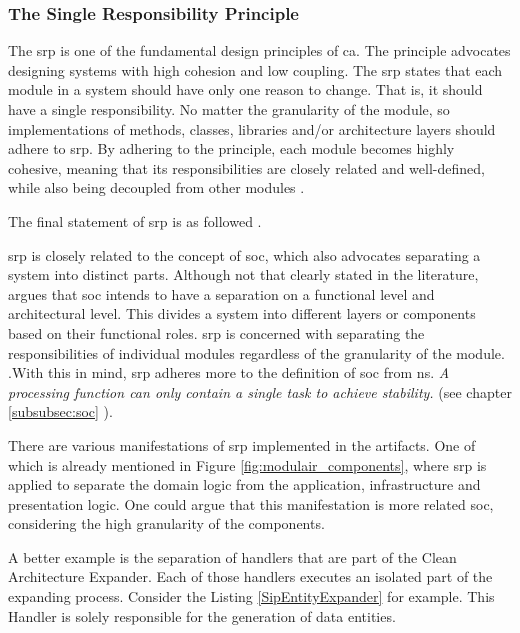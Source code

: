 \subsubsection*{The Single Responsibility Principle} \label{subsubsec:srp}

The \gls{srp} is one of the fundamental design principles of \gls{ca}. The principle
advocates designing systems with high cohesion and low coupling. The \gls{srp} states that
each module in a system should have only one reason to change. That is, it should have a
single responsibility. No matter the granularity of the module, so implementations of
methods, classes, libraries and/or architecture layers should adhere to \gls{srp}. By
adhering to the principle, each module becomes highly cohesive, meaning that its
responsibilities are closely related and well-defined, while also being decoupled from
other modules \parencite[81]{robert_c_martin_clean_2018}.

The final statement of \gls{srp} is as followed
\parencite[82]{robert_c_martin_clean_2018}.


\gls{srp} is closely related to the concept of \gls{soc}, which also advocates separating
a system into distinct parts. Although not that clearly stated in the literature,
\citeauthor{robert_c_martin_clean_2018} argues that \gls{soc} intends to have a separation
on a functional level and architectural level. This divides a system into different layers
or components based on their functional roles. \gls{srp} is concerned with separating the
responsibilities of individual modules regardless of the granularity of the module.
\parencite[205]{robert_c_martin_clean_2018}.With this in mind, \gls{srp} adheres more to
the definition of \gls{soc} from \gls{ns}. \textit{A processing function can only contain
a single task to achieve stability.} (see chapter \ref{subsubsec:soc}
).

There are various manifestations of \gls{srp} implemented in the artifacts. One of which is
already mentioned in Figure \ref{fig:modulair_components}, where \gls{srp} is applied to
separate the domain logic from the application, infrastructure and presentation logic. One
could argue that this manifestation is more related \gls{soc}, considering the high
granularity of the components.

A better example is the separation of handlers that are part of the Clean Architecture
Expander. Each of those handlers executes an isolated part of the expanding process.
Consider the Listing \ref{SipEntityExpander} 
\parencite{koks_expandentitieshandlerinteractor_2023} for example. This Handler is solely
responsible for the generation of data entities. 

